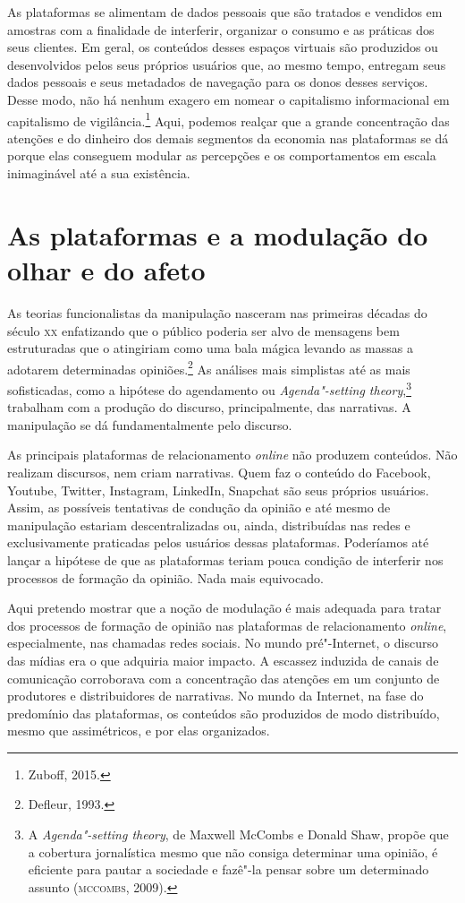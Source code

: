 As plataformas se alimentam de dados pessoais que são tratados e
vendidos em amostras com a finalidade de interferir, organizar o consumo
e as práticas dos seus clientes. Em geral, os conteúdos desses espaços
virtuais são produzidos ou desenvolvidos pelos seus próprios usuários
que, ao mesmo tempo, entregam seus dados pessoais e seus metadados de
navegação para os donos desses serviços. Desse modo, não há nenhum
exagero em nomear o capitalismo informacional em capitalismo de
vigilância.\footnote{Zuboff, 2015.} Aqui, podemos realçar que a grande
concentração das atenções e do dinheiro dos demais segmentos da economia
nas plataformas se dá porque elas conseguem modular as percepções e os
comportamentos em escala inimaginável até a sua existência.

\section{As plataformas e a modulação do olhar e do afeto}

As teorias funcionalistas da manipulação nasceram nas primeiras décadas
do século \textsc{xx} enfatizando que o público poderia ser alvo de mensagens bem
estruturadas que o atingiriam como uma bala mágica levando as massas a
adotarem determinadas opiniões.\footnote{Defleur, 1993.} As análises mais
simplistas até as mais sofisticadas, como a hipótese do agendamento ou
\emph{Agenda"-setting theory},\footnote{A \emph{Agenda"-setting theory}, de
  Maxwell McCombs e Donald Shaw, propõe que a cobertura jornalística
  mesmo que não consiga determinar uma opinião, é eficiente para pautar a
  sociedade e fazê"-la pensar sobre um determinado assunto (\textsc{mccombs}, 2009).} trabalham com a produção do discurso, principalmente, das narrativas. A manipulação se dá
fundamentalmente pelo discurso.

As principais plataformas de relacionamento \emph{online} não produzem
conteúdos. Não realizam discursos, nem criam narrativas. Quem faz o
conteúdo do Facebook, Youtube, Twitter, Instagram, LinkedIn, Snapchat
são seus próprios usuários. Assim, as possíveis tentativas de condução
da opinião e até mesmo de manipulação estariam descentralizadas ou,
ainda, distribuídas nas redes e exclusivamente praticadas pelos usuários
dessas plataformas. Poderíamos até lançar a hipótese de que as
plataformas teriam pouca condição de interferir nos processos de
formação da opinião. Nada mais equivocado.

Aqui pretendo mostrar que a noção de modulação é mais adequada para
tratar dos processos de formação de opinião nas plataformas de
relacionamento \emph{online}, especialmente, nas chamadas redes sociais. No
mundo pré"-Internet, o discurso das mídias era o que adquiria maior
impacto. A escassez induzida de canais de comunicação corroborava com a
concentração das atenções em um conjunto de produtores e distribuidores
de narrativas. No mundo da Internet, na fase do predomínio das
plataformas, os conteúdos são produzidos de modo distribuído, mesmo que
assimétricos, e por elas organizados.

